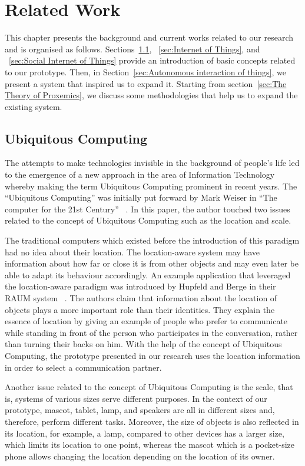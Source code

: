 \chapter{Related Work}
\label{ch:related-work}
This chapter presents the background and current works related to our research and is organised as follows.
Sections~\ref{sec:Ubiquitous Computing}, ~\ref{sec:Internet of Things}, and ~\ref{sec:Social Internet of Things}
provide an introduction of basic concepts related to our prototype.
Then, in Section~\ref{sec:Autonomous interaction of things}, we present a system that inspired us to expand it.
Starting from section~\ref{sec:The Theory of Proxemics}, we discuss some methodologies
that help us to expand the existing system.

\section{Ubiquitous Computing}
\label{sec:Ubiquitous Computing}
The attempts to make technologies invisible in the background of people’s life led to the emergence
of a new approach in the area of Information Technology whereby making the term
Ubiquitous Computing prominent in recent years.
The “Ubiquitous Computing” was initially put forward by Mark Weiser
in “The computer for the 21st Century” ~\cite{weiser2002computer}.
In this paper, the author touched two issues related to the concept of
Ubiquitous Computing such as the location and scale.

The traditional computers which existed before the introduction of this
paradigm had no idea about their location.
The location-aware system may have information about how far or close it is from other
objects and may even later be able to adapt its behaviour accordingly.
An example application that leveraged the location-aware paradigm was introduced by
Hupfeld and Berge in their RAUM system ~\cite{hupfeld2000spatially}.
The authors claim that information about the location of objects plays
a more important role than their identities.
They explain the essence of location by giving an example of people who prefer to communicate
while standing in front of the person who participates in the conversation, rather than turning their backs on him.
With the help of the concept of Ubiquitous Computing, the prototype presented in our
research uses the location information in order to select a communication partner.

Another issue related to the concept of Ubiquitous Computing is the scale,
that is, systems of various sizes serve different purposes.
In the context of our prototype, mascot, tablet, lamp, and speakers are all in
different sizes and, therefore, perform different tasks.
Moreover, the size of objects is also reflected in its location, for example, a lamp, compared
to other devices has a larger size, which limits its location to one point, whereas the mascot
which is a pocket-size phone allows changing the location depending on the location of its owner.

